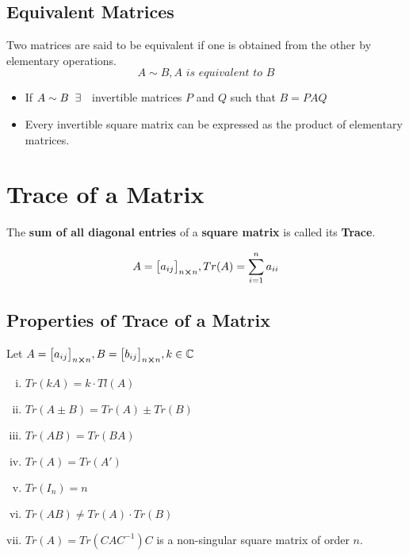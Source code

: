 \documentclass{article}
\begin{document}
\subsection{Equivalent Matrices}
Two matrices are said to be equivalent if one is obtained from the other by elementary operations.
$$A \sim B, \textit{A is equivalent to B} $$

\begin{itemize}
    \item If $A \sim B \hspace{2mm} \exists \hspace{2mm}$ invertible matrices $P$ and $Q$ such that $B=PAQ$
    \item Every invertible square matrix can be expressed as the product of elementary matrices.
\end{itemize}

\section{Trace of a Matrix}
The \textbf{sum of all diagonal entries} of a \textbf{square matrix} is called its \textbf{Trace}.

$$A={\begin{bmatrix}
        a_{ij}
    \end{bmatrix}}_{n \cross n}, Tr(A)=\displaystyle \sum _{i=1}^{n} a_{ii} $$

\subsection{Properties of Trace of a Matrix}

Let $A={\begin{bmatrix}
        a_{ij}
    \end{bmatrix}}_{n \cross n}, B={\begin{bmatrix}
                b_{ij}
            \end{bmatrix}}_{n \cross n}, k \in \mathbb{C} $
\begin{enumerate}[i.]
    \item $Tr(kA)=k \cdot Tl(A) $
    \item $Tr(A \pm B)= Tr(A) \pm Tr(B)$
    \item $Tr(AB)=Tr(BA)$
    \item $Tr(A)=Tr(A')$
    \item $Tr(I_{n})=n$
    \item $Tr(AB) \not= Tr(A) \cdot Tr(B)$
    \item $Tr(A)=Tr(CAC^{-1}) C$ is a non-singular square matrix of order $n$.
\end{enumerate}
\end{document}
